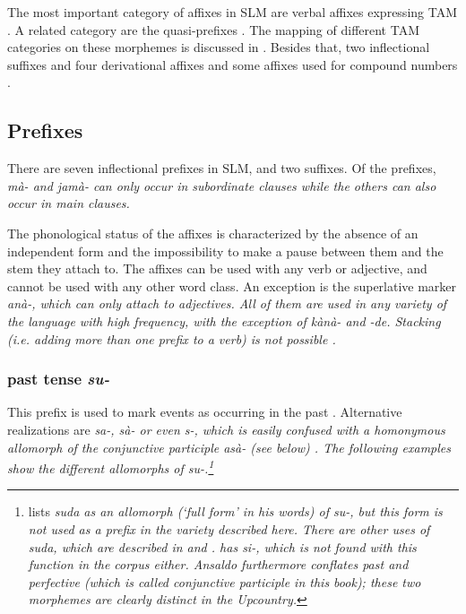 The most important category of affixes in SLM are verbal affixes expressing TAM . A related category are the quasi-prefixes . The mapping of different TAM categories on these morphemes is discussed in . Besides that, two inflectional suffixes  and  four derivational affixes  and some affixes used for compound numbers .


\subsection{Prefixes}\label{sec:morph:Prefixes}
There are seven  inflectional prefixes in SLM, and two suffixes. Of the prefixes,  \em mà- \em and \em jamà- \em can only occur in subordinate clauses while the others can also occur in main clauses.

The phonological status of the affixes is characterized by the absence of an independent form and the impossibility to make a pause between them and the stem they attach to. The affixes can be used with any verb or adjective, and cannot be used with any other word class. An exception is the superlative marker \em anà-\em, which can only attach to adjectives. All of them are used in any variety of the language with high frequency, with the exception of \em kànà- \em and \em -de\em. Stacking (i.e. adding more than one prefix to a verb) is not possible \citep[cf.][144]{Slomanson2006cll}.


\subsubsection{past tense \em su-\em}\label{sec:morph:su-}
This prefix is used to mark events as occurring in the past \citep[166]{SmithEtAl2006cll} . Alternative realizations are \em sa-, sà- \em or even \em s-\em, which is easily confused with a homonymous allomorph of the conjunctive participle  \em asà- \em (see below) \citep[cf.][137]{Slomanson2006cll}. The following examples show the different allomorphs of \em su-\em.\footnote{\citet[31]{Adelaar1991}
 lists \em suda \em as an allomorph (`full form' in his words) of \em su-\em, but this form is not used as a prefix in the variety described here. There are other uses of \em suda\em, which are described in   and . \citet{Ansaldo2009book} has \em si-\em, which is not found with this function in the corpus either. Ansaldo furthermore conflates past and perfective (which is called conjunctive participle in this book); these two morphemes are clearly distinct in the Upcountry.}

